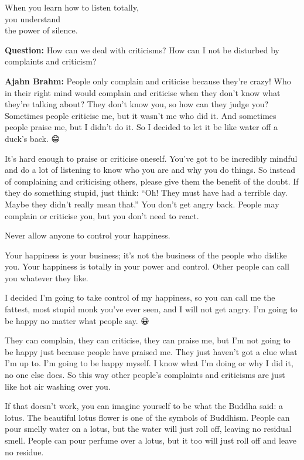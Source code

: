 \documentclass[12pt, openany]{book}
\newenvironment{aphorism}%
{%
\begin{center}\begin{itshape}
}%
{\end{itshape}\end{center}
}%
\begin{document}
\begin{aphorism}
When you learn how to listen totally,\\  
you understand\\ 
the power of silence.
\end{aphorism}

\textbf{Question:} How can we deal with criticisms? How can I not be disturbed by complaints and criticism? 

\textbf{Ajahn Brahm:} People only complain and criticise because they’re crazy! Who in their right mind would complain and criticise when they don’t know what they’re talking about? They don’t know you, so how can they judge you? Sometimes people criticise me, but it wasn’t me who did it. And sometimes people praise me, but I didn’t do it. So I decided to let it be like water off a duck’s back. 😁

It’s hard enough to praise or criticise oneself. You’ve got to be incredibly mindful and do a lot of listening to know who you are and why you do things. So instead of complaining and criticising others, please give them the benefit of the doubt. If they do something stupid, just think: “Oh! They must have had a terrible day. Maybe they didn’t really mean that.” You don’t get angry back. People may complain or criticise you, but you don’t need to react. 

\begin{aphorism}
Never allow anyone to control your happiness.
\end{aphorism}

Your happiness is your business; it’s not the business of the people who dislike you. Your happiness is totally in your power and control. Other people can call you whatever they like. 

I decided I’m going to take control of my happiness, so you can call me the fattest, most stupid monk you’ve ever seen, and I will not get angry. I’m going to be happy no matter what people say. 😀

They can complain, they can criticise, they can praise me, but I’m not going to be happy just because people have praised me. They just haven’t got a clue what I’m up to. I’m going to be happy myself. I know what I’m doing or why I did it, no one else does. So this way other people’s complaints and criticisms are just like hot air washing over you. 

If that doesn’t work, you can imagine yourself to be what the Buddha said: a lotus. The beautiful lotus flower is one of the symbols of Buddhism. People can pour smelly water on a lotus, but the water will just roll off, leaving no residual smell. People can pour perfume over a lotus, but it too will just roll off and leave no residue. 
\end{document}
